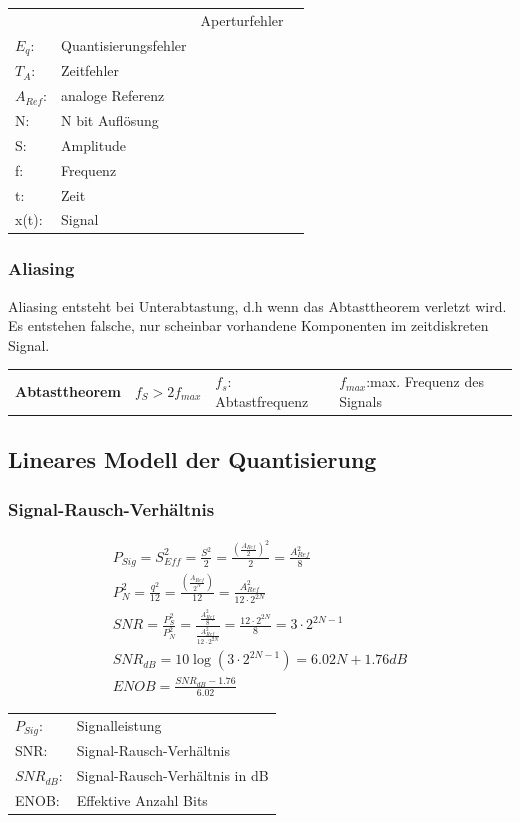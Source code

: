 \begin{longtable}[c]{ l  l l l }
\begin{minipage}{5cm}
\end{minipage}

&
\begin{minipage}{5cm}
\begin{tabular}{ll}
$E_{A}$: &Aperturfehler\\
$E_{q}$:&Quantisierungsfehler\\
$T_{A}$:&Zeitfehler\\
$A_{Ref}$:&analoge Referenz\\
N:& N bit Auflösung\\
S: &Amplitude\\
f: &Frequenz\\
t: &Zeit\\
x(t):&Signal
\end{tabular}


\end{minipage}
\\
\end{longtable}


\subsubsection{Aliasing}
Aliasing entsteht bei Unterabtastung, d.h wenn das Abtasttheorem verletzt wird.
Es entstehen falsche, nur scheinbar vorhandene Komponenten im zeitdiskreten
Signal.

\begin{tabular}{llll}
	\textbf{Abtasttheorem}
	& $f_{S}>2f_{max}$
	& $f_{s}$: Abtastfrequenz
	&$f_{max}$:max. Frequenz des Signals
\end{tabular}

\subsection{Lineares Modell der Quantisierung}
\subsubsection{Signal-Rausch-Verhältnis}
\begin{multicols}{2}
\begin{gather*}
P_{Sig}=S^2_{Eff} =
\frac{S^2}{2}=\frac{(\frac{A_{Ref}}{2})^2}{2}=\frac{A^2_{Ref}}{8}\\
P^2_{N}=\frac{q^2}{12}=\frac{(\frac{A_{Ref}}{2^N})}{12}=\frac{A^2_{Ref}}{12\cdot2^{2N}}\\
SNR=\frac{P^2_{S}}{P^2_{N}}=\frac{\frac{A^2_{Ref}}{8}}{\frac{A^2_{Ref}}{12\cdot2^{2N}}}=\frac{12\cdot2^{2N}}{8}=3\cdot2^{2N-1}\\
SNR_{dB}=10\log(3\cdot2^{2N-1})=6.02N+1.76dB\\
ENOB=\frac{SNR_{dB}-1.76}{6.02}
\end{gather*}

\begin{tabular}{ll}
$P_{Sig}$:&Signalleistung\\
SNR:&Signal-Rausch-Verhältnis\\
$SNR_{dB}$:&Signal-Rausch-Verhältnis in dB\\
ENOB:&Effektive Anzahl Bits\\
\end{tabular}
\end{multicols}